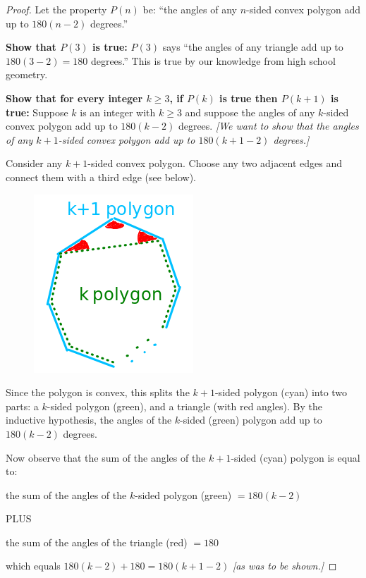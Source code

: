 \documentclass[14pt]{extarticle}
\begin{document}
\begin{proof}
Let the property $P(n)$ be: ``the angles of any $n$-sided convex polygon add up to $180(n - 2)$ degrees.''

{\bf Show that $P(3)$ is true:} $P(3)$ says ``the angles of any triangle add up to $180(3 - 2) = 180$ degrees.'' This is true by our knowledge from high school geometry.

{\bf Show that for every integer $k \geq 3$, if $P(k)$ is true then $P(k+1)$ is true:} Suppose $k$ is an integer with $k \geq 3$ and suppose the angles of any $k$-sided convex polygon add up to $180(k - 2)$ degrees. {\it [We want to show that the angles of any $k+1$-sided convex polygon add up to $180(k+1 - 2)$ degrees.]}

Consider any $k+1$-sided convex polygon. Choose any two adjacent edges and connect them with a third edge (see below).

\begin{figure}[ht!]
\centering
\includegraphics[scale=0.5]{../images/5.3.39.png}
\end{figure}

Since the polygon is convex, this splits the $k+1$-sided polygon (cyan) into two parts: a $k$-sided polygon (green), and a triangle (with red angles). By the inductive hypothesis, the angles of the $k$-sided (green) polygon add up to $180(k - 2)$ degrees. 

Now observe that the sum of the angles of the $k+1$-sided (cyan) polygon is equal to: 

the sum of the angles of the $k$-sided polygon (green) $ = 180(k-2)$

PLUS 

the sum of the angles of the triangle (red) $ = 180$

which equals $180(k-2) + 180 = 180(k+1-2)$ {\it [as was to be shown.]}
\end{proof}
\end{document}
